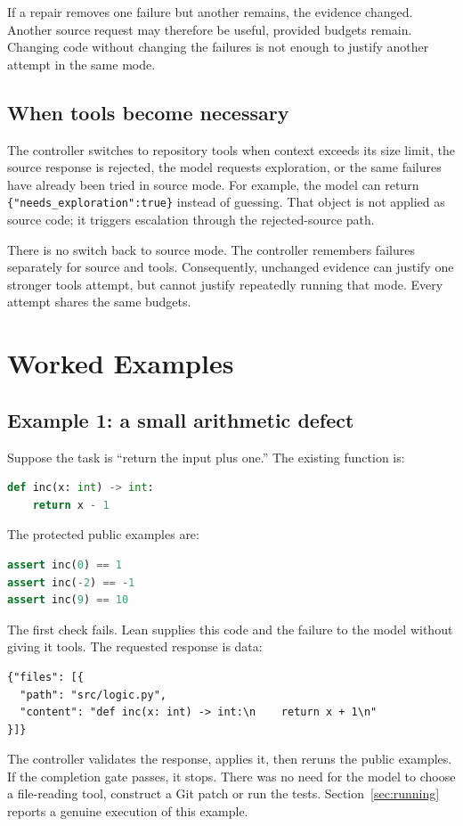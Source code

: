 \documentclass[10pt,twocolumn,a4paper]{article}
\begin{document}
If a repair removes one failure but another remains, the evidence changed.
Another source request may therefore be useful, provided budgets remain.
Changing code without changing the failures is not enough to justify
another attempt in the same mode.

\subsection{When tools become necessary}
The controller switches to repository tools when context exceeds its size
limit, the source response is rejected, the model requests exploration,
or the same failures have already been tried in source mode. For example,
the model can return \texttt{\{"needs\_exploration":true\}} instead of guessing.
That object is not applied as source code; it triggers escalation through
the rejected-source path.

There is no switch back to source mode. The controller remembers failures
separately for source and tools. Consequently, unchanged evidence can justify
one stronger tools attempt, but cannot justify repeatedly running that mode.
Every attempt shares the same budgets.

\section{Worked Examples}
\subsection{Example 1: a small arithmetic defect}
Suppose the task is ``return the input plus one.'' The existing function is:
\begin{lstlisting}[language=Python]
def inc(x: int) -> int:
    return x - 1
\end{lstlisting}
The protected public examples are:
\begin{lstlisting}[language=Python]
assert inc(0) == 1
assert inc(-2) == -1
assert inc(9) == 10
\end{lstlisting}
The first check fails. Lean supplies this code and the failure to the model
without giving it tools. The requested response is data:
\begin{lstlisting}
{"files": [{
  "path": "src/logic.py",
  "content": "def inc(x: int) -> int:\n    return x + 1\n"
}]}
\end{lstlisting}
The controller validates the response, applies it, then reruns the public
examples. If the completion gate passes, it stops. There was no need for the
model to choose a file-reading tool, construct a Git patch or run the tests.
Section~\ref{sec:running} reports a genuine execution of this example.
\end{document}
